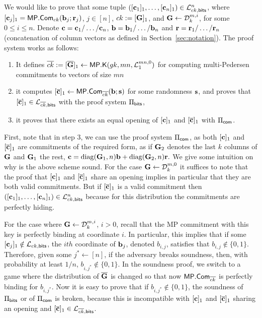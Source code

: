 We would like to prove that some tuple
$([\mathbf{c}_1]_1,\ldots, [\mathbf{c}_n]_1) \in \mathcal{L}_{ck,\mathsf{bits}}^n$, where $[\mathbf{c}_j]_1=\mathsf{MP}.\mathsf{Com}_{ck}(\mathbf{b}_j;\mathbf{r}_j)$, $j \in [n]$, $ck:=[\mathbf{{G}}]_1$, and $\mathbf{{G}} \gets \mathcal{D}_k^{m,i}$, for some $0 \leq i \leq n$. 
Denote $\mathbf{c}=\mathbf{c}_1 / \ldots / \mathbf{c}_n$, $\mathbf{b}=\mathbf{b}_1 / \ldots / \mathbf{b}_n$ and $\mathbf{r}=\mathbf{r}_1 / \ldots / \mathbf{r}_n$ (concatenation of column vectors as defined in Section~\ref{sec:notation}). The proof system works as follows:
\begin{enumerate}
\item It defines  
 $\overline{ck}:=[\overline{\mathbf{{G}}}]_1\gets\mathsf{MP}.\mathsf{K}(gk,mn,\mathcal{L}_{1}^{mn,0})$ for computing multi-Pedersen commitments to vectors of size $mn$

\item it computes $[{\overline{\mathbf{c}}}]_1\gets\mathsf{MP}.\mathsf{Com}_{\overline{ck}}(\mathbf{b};\mathbf{s})$ for some 
randomness $\mathbf{s}$, and proves that $[{\overline{\mathbf{c}}}]_1\in\mathcal{L}_{\overline{ck},\mathsf{bits}}$ with the proof system $\Pi_{\mathsf{bits}}$,
\item it  proves that there exists an equal opening of $[\mathbf{c}]_1$ and $[{\overline{\mathbf{c}}}]_1$ with  $\Pi_{\mathsf{com}}$.
\end{enumerate}
First, note that in step 3, we can use the proof system $\Pi_{\mathsf{com}}$, as both $[\mathbf{c}]_1$ and $[{\overline{\mathbf{c}}}]_1$ are commitments of the required form, as if $\mathbf{{G}}_2$ denotes the last $k$ columns 
of $\mathbf{{G}}$ and $\mathbf{{G}}_1$ the rest,
$\mathbf{c}=\mathrm{diag}(\mathbf{{G}}_1,n)\mathbf{b}+\mathrm{diag}(\mathbf{{G}}_2,n)\mathbf{r}.
$
We give some intuition on why is the above scheme sound. For the case $\mathbf{{G}} \gets \mathcal{D}_k^{m,0}$ it suffices to note that the proof that  $[\mathbf{c}]_1$ and $[{\overline{\mathbf{c}}}]_1$ share an opening implies in particular that they are both valid commitments. But if 
$[{\overline{\mathbf{c}}}]_1$ is a valid commitment then $([\mathbf{c}_1]_1,\ldots, [\mathbf{c}_n]_1) \in \mathcal{L}_{ck,\mathsf{bits}}^n$ because for this distribution the commitments are perfectly hiding. 

For the case where $\mathbf{{G}} \gets \mathcal{D}_k^{m,i}$, $i>0$, 
recall that the MP commitment with this key is 
perfectly binding at coordinate $i$. In particular, this implies that if some $[\mathbf{c}_j]_1 \notin \mathcal{L}_{ck,\mathsf{bits}}$, the $ith$ coordinate of $\mathbf{b}_j$, denoted $b_{i,j}$, satisfies that $b_{i,j} \notin \{0,1\}$. Therefore, given some $j^* \gets [n]$, if the adversary breaks soundness, then, with probability at least $1/n$, $b_{i,j^*} \notin \{0,1\}$. In the soundness proof, we switch to a game where the distribution of $\overline{\mathbf{{G}}}$ is changed so that now 
$\mathsf{MP}.\mathsf{Com}_{\overline{ck}}$ is perfectly binding for $b_{i,j^*}$. Now it is easy to prove that if $b_{i,j^*} \notin \{0,1\}$, the soundness of $\Pi_{\mathsf{bits}}$ or of $\Pi_{\mathsf{com}}$ is broken, because this is incompatible with $[\mathbf{c}]_1$ and $[{\overline{\mathbf{c}}}]_1$ sharing an opening and $[{\overline{\mathbf{c}}}]_1 \in\mathcal{L}_{\overline{ck},\mathsf{bits}}$.
